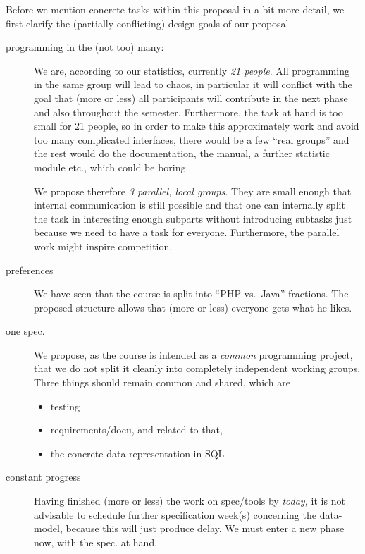 \documentclass[11pt,handout]{handout}
\begin{document}
Before we mention concrete tasks within this proposal in a bit more detail,
we first clarify the (partially conflicting) design goals of our proposal.
\begin{description}
\item[programming in the (not too) many:] We are, according to our
  statistics, currently \emph{21 people}. All programming in the same group
  will lead to chaos, in particular it will conflict with the goal that
  (more or less) all participants will contribute in the next phase and
  also throughout the semester. Furthermore, the task at hand is too small
  for 21 people, so in order to make this approximately work and avoid too
  many complicated interfaces, there would be a few ``real groups'' and the
  rest would do the documentation, the manual, a further statistic module
  etc., which could be boring.
  
  We propose therefore \emph{3 parallel, local groups.} They are small
  enough that internal communication is still possible and that one can
  internally split the task in interesting enough subparts without
  introducing subtasks just because we need to have a task for everyone.
  Furthermore, the parallel work might inspire competition.
\item[preferences] We have seen that the course is split into ``PHP vs.\ 
  Java'' fractions. The proposed structure allows that (more or less)
  everyone gets what he likes.
\item[one spec.] We propose, as the course is intended as a \emph{common}
  programming project, that we do not split it cleanly into completely
  independent working groups. Three things should remain common and shared,
  which are
  \begin{itemize}
  \item testing
  \item requirements/docu, and related to that, 
  \item the concrete data representation in SQL
  \end{itemize}
\item[constant progress] Having finished (more or less) the work on
  spec/tools by \emph{today,} it is not advisable to schedule further
  specification week(s) concerning the data-model, because this will just
  produce delay. We must enter a new phase now, with the spec. at hand.
\end{description}
\end{document}
